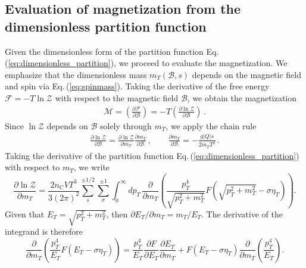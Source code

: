 \documentclass[epjST]{svjour}
\newcommand{\req}[1]{Eq.\,(\ref{#1})}
\begin{document}
\subsection{Evaluation of magnetization from the dimensionless partition function}
\label{sec:magnetization_evaluation}
Given the dimensionless form of the partition function \req{eq:dimensionless_partition}, we proceed to evaluate the magnetization. We emphasize that the dimensionless mass \(m_{T}(\mathcal{B},s)\) depends on the magnetic field and spin via \req{eq:spinmass}. Taking the derivative of the free energy \(\mathcal{F} = -T \ln\mathcal{Z}\) with respect to the magnetic field \(\mathcal{B}\), we obtain the magnetization
\begin{align}
\label{eq:magnetization_def}
\mathcal{M} = \left( \frac{\partial \mathcal{F}}{\partial \mathcal{B}} \right) = -T \left( \frac{\partial \ln\mathcal{Z}}{\partial \mathcal{B}} \right)\,.
\end{align} 
Since \(\ln\mathcal{Z}\) depends on \(\mathcal{B}\) solely through \(m_{T}\), we apply the chain rule
\begin{align}
\label{eq:chain_rule}
\frac{\partial \ln\mathcal{Z}}{\partial \mathcal{B}} = \frac{\partial \ln\mathcal{Z}}{\partial m_{T}} \frac{\partial m_{T}}{\partial \mathcal{B}}\,,\qquad
\frac{\partial m_{T}}{\partial \mathcal{B}} = -\frac{g|Q|s}{2m_{T}T^2}\,.
\end{align}
Taking the derivative of the partition function \req{eq:dimensionless_partition} with respect to \(m_{T}\), we write
\begin{equation}
\frac{\partial \ln \mathcal{Z}}{\partial m_{T}} = \frac{2 n_\mathrm{C} V T^{3}}{3 (2\pi)^{2}} \sum_{s}^{\pm1/2}\sum_{\sigma}^{\pm1} \int_{0}^{\infty} dp_{T} \, \frac{\partial}{\partial m_{T}} \left( \frac{p_{T}^{4}}{\sqrt{p_{T}^{2} + m_{T}^{2}}} F\left(\sqrt{p_{T}^{2} + m_{T}^{2}} - \sigma \eta_{T} \right) \right).
\end{equation}
Given that \(E_{T} = \sqrt{p_{T}^{2} + m_{T}^{2}}\), then \(\partial E_{T} / \partial m_{T} = m_{T} / E_{T}\). The derivative of the integrand is therefore
\begin{equation}
\frac{\partial}{\partial m_{T}} \left( \frac{p_{T}^{4}}{E_{T}} F(E_{T} - \sigma\eta_{T}) \right) = \frac{p_{T}^{4}}{E_{T}} \frac{\partial F}{\partial E_{T}} \frac{\partial E_{T}}{\partial m_{T}} + F(E_{T} - \sigma\eta_{T}) \frac{\partial}{\partial m_{T}} \left( \frac{p_{T}^{4}}{E_{T}} \right).
\end{equation}
\end{document}
